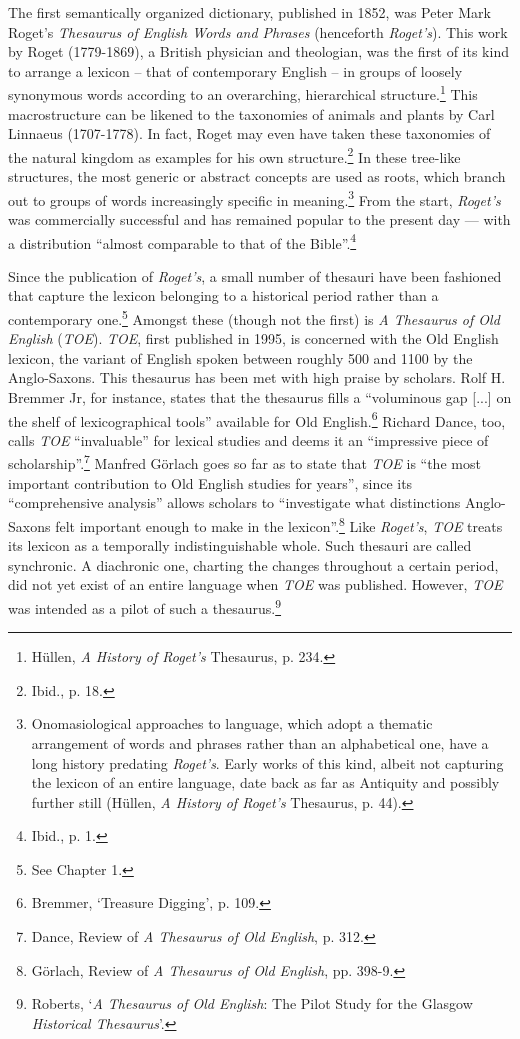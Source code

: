 The first semantically organized dictionary, published in 1852, was Peter Mark Roget's \textit{Thesaurus of English Words and Phrases} (henceforth \textit{Roget's}). This work by Roget (1779-1869), a British physician and theologian, was the first of its kind to arrange a lexicon -- that of contemporary English -- in groups of loosely synonymous words according to an overarching, hierarchical structure.\footnote{Hüllen, \textit{A History of Roget's} Thesaurus, p. 234.} This macrostructure can be likened to the taxonomies of animals and plants by Carl Linnaeus (1707-1778). In fact, Roget may even have taken these taxonomies of the natural kingdom as examples for his own structure.\footnote{Ibid., p. 18.} In these tree-like structures, the most generic or abstract concepts are used as roots, which branch out to groups of words increasingly specific in meaning.\footnote{Onomasiological approaches to language, which adopt a thematic arrangement of words and phrases rather than an alphabetical one, have a long history predating \textit{Roget's}. Early works of this kind, albeit not capturing the lexicon of an entire language, date back as far as Antiquity and possibly further still (Hüllen, \textit{A History of Roget's} Thesaurus, p. 44).} From the start, \textit{Roget's} was commercially successful and has remained popular to the present day --- with a distribution ``almost comparable to that of the Bible''.\footnote{Ibid., p. 1.}

Since the publication of \textit{Roget's}, a small number of thesauri have been fashioned that capture the lexicon belonging to a historical period rather than a contemporary one.\footnote{See Chapter 1.} Amongst these (though not the first) is \textit{A Thesaurus of Old English} (\textit{TOE}). \textit{TOE}, first published in 1995, is concerned with the Old English lexicon, the variant of English spoken between roughly 500 and 1100 by the Anglo-Saxons. This thesaurus has been met with high praise by scholars. Rolf H. Bremmer Jr, for instance, states that the thesaurus fills a ``voluminous gap [...] on the shelf of lexicographical tools'' available for Old English.\footnote{Bremmer, `Treasure Digging', p. 109.} Richard Dance, too, calls \textit{TOE} ``invaluable'' for lexical studies and deems it an ``impressive piece of scholarship''.\footnote{Dance, Review of \textit{A Thesaurus of Old English}, p. 312.} Manfred Görlach goes so far as to state that \textit{TOE} is ``the most important contribution to Old English studies for years'', since its ``comprehensive analysis'' allows scholars to ``investigate what distinctions Anglo-Saxons felt important enough to make in the lexicon''.\footnote{Görlach, Review of \textit{A Thesaurus of Old English}, pp. 398-9.} Like \textit{Roget's}, \textit{TOE} treats its lexicon as a temporally indistinguishable whole. Such thesauri are called synchronic. A diachronic one, charting the changes throughout a certain period, did not yet exist of an entire language when \textit{TOE} was published. However, \textit{TOE} was intended as a pilot of such a thesaurus.\footnote{Roberts, `\textit{A Thesaurus of Old English}: The Pilot Study for the Glasgow \textit{Historical Thesaurus}'.}

